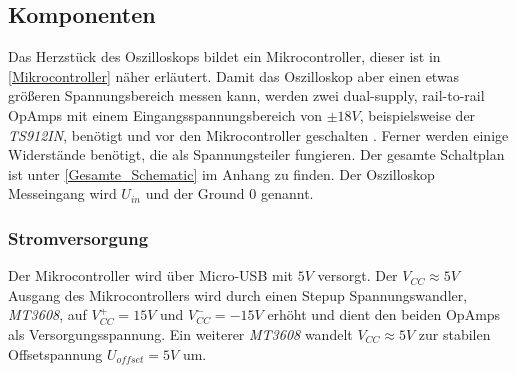 \subsection{Komponenten}

Das Herzstück des Oszilloskops bildet ein Mikrocontroller, dieser ist in \autoref{Mikrocontroller} näher
erläutert. Damit das Oszilloskop aber einen etwas größeren Spannungsbereich messen kann, werden
zwei dual-supply, rail-to-rail OpAmps mit einem Eingangsspannungsbereich von $\pm18V$,
beispielsweise der \textit{TS912IN}, benötigt und vor den Mikrocontroller geschalten
\cite{Opamp_Datasheet}.
Ferner werden einige Widerstände benötigt, die als Spannungsteiler fungieren.
Der gesamte Schaltplan ist unter \ref{Gesamte_Schematic} im Anhang zu finden.
Der Oszilloskop Messeingang wird $U_{in}$ und der Ground $0$ genannt.


\subsubsection{Stromversorgung}
Der Mikrocontroller wird über Micro-USB mit $5V$ versorgt. \newline
Der $V_{CC} \approx 5V$ Ausgang des Mikrocontrollers wird durch einen Stepup Spannungswandler,
\textit{MT3608}, auf $V^{+}_{CC} = 15V$ und $V^{-}_{CC} = -15V$ erhöht und dient den beiden OpAmps als
Versorgungsspannung.
Ein weiterer \textit{MT3608} wandelt $V_{CC} \approx 5V$ zur stabilen Offsetspannung $U_{offset} = 5V$ um.




